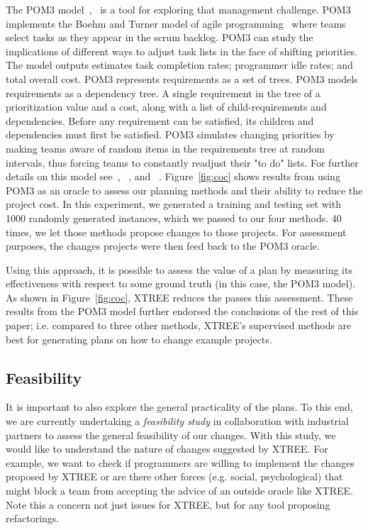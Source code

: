 \documentclass{sig-alternate}
\newcommand{\fig}[1]{Figure~\ref{fig:#1}}
\begin{document}
The POM3 model~\cite{boehm2003using},~\cite{port2008} is a tool for exploring that management challenge. POM3 implements the Boehm and Turner model of agile programming~\cite{boehm2003balancing} where teams select tasks as they appear in the scrum backlog.  POM3 can study the implications of different ways to adjust task lists in the face of shifting priorities. The model outputs estimates task completion rates; programmer idle rates; and total overall cost. POM3 represents requirements as a set of trees. POM3 models requirements as a dependency tree. A single requirement in the tree of a prioritization value and a cost, along with a list of child-requirements and dependencies. Before any requirement can be satisfied, its children and dependencies must first be satisfied. POM3 simulates changing priorities by making teams aware of random items in the requirements tree at random intervals, thus forcing teams to constantly readjust their "to do" lists. For further details on this model see~\cite{boehm2003balancing}, ~\cite{boehm2003using}, and ~\cite{port2008}. \fig{coc} shows results from using POM3 as an oracle to assess our planning methods and their ability to reduce the project cost. In this experiment, we generated a training and testing set with 1000 randomly generated instances, which we passed to our four methods.
40 times, we let those methods propose changes to those projects. 
For assessment purposes, the changes projects were then feed back to the POM3
oracle. 

Using this approach, it is possible to assess the value of a plan by measuring its
effectiveness with respect to some ground truth (in this case, the POM3 model).
As shown in \fig{coc}, XTREE reduces the  passes this assessment. These results from the POM3 model further endorsed the conclusions of the rest
of this paper; i.e. compared to three other methods,  XTREE's supervised methods are best for generating plans on how to change example projects.

\subsection{  Feasibility}\label{sect:feasibility}
It is important to also explore the general practicality of the plans. To this end, we are currently undertaking a \textit{feasibility study} in collaboration with industrial partners to assess the general feasibility of our changes. With this study, we would like to understand the nature of changes suggested by XTREE. For example, we want to check if programmers are willing to implement the changes proposed by XTREE or are there other forces (e.g. social, psychological) that might block a team from accepting the advice of an outside oracle like XTREE. Note this a concern not just issues for XTREE, but for any tool proposing refactorings.
 
\end{document}
